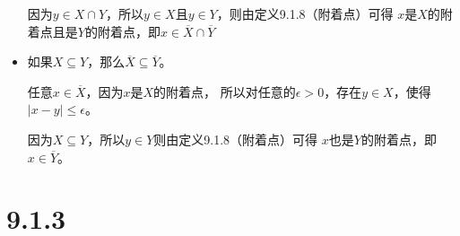 \documentclass{article}
\begin{document}
\begin{itemize}
            因为$y \in X \cap Y$，所以$y \in X$且$y \in Y$，则由定义9.1.8（附着点）可得
            $x$是$X$的附着点且是$Y$的附着点，即$x \in \overline{X} \cap \overline{Y}$

      \item 如果$X \subseteq Y$，那么$\overline{X} \subseteq \overline{Y}$。

            任意$x \in \overline{X}$，因为$x$是$X$的附着点，
            所以对任意的$\epsilon > 0$，存在$y \in X$，使得$|x - y| \leq \epsilon$。

            因为$X \subseteq Y$，所以$y \in Y$则由定义9.1.8（附着点）可得
            $x$也是$Y$的附着点，即$x \in \overline{Y}$。

\end{itemize}

\section*{9.1.3}
\end{document}
